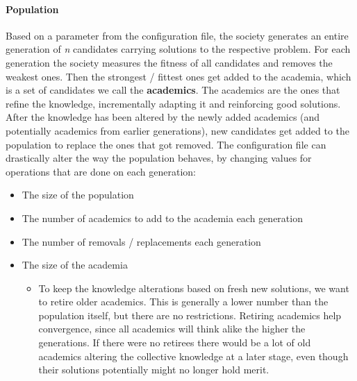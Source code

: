 \documentclass[a4paper,english]{report}
\begin{document}
		\paragraph{Population}
		Based on a parameter from the configuration file, the society generates an entire generation of \textit{n} candidates carrying solutions to the respective problem. For each generation the society measures the fitness of all candidates and removes the weakest ones. Then the strongest / fittest ones get added to the academia, which is a set of candidates we call the \textbf{academics}. The academics are the ones that refine the knowledge, incrementally adapting it and reinforcing good solutions. After the knowledge has been altered by the newly added academics (and potentially academics from earlier generations), new candidates get added to the population to replace the ones that got removed. The configuration file can drastically alter the way the population behaves, by changing values for operations that are done on each generation:
		\begin{itemize}
			\item The size of the population
			\item The number of academics to add to the academia each generation
			\item The number of removals / replacements each generation
			\item The size of the academia
			   \begin{itemize}
				\item To keep the knowledge alterations based on fresh new solutions, we want to retire older academics. This is generally a lower number than the population itself, but there are no restrictions. Retiring academics help convergence, since all academics will think alike the higher the generations. If there were no retirees there would be a lot of old academics altering the collective knowledge at a later stage, even though their solutions potentially might no longer hold merit.
				\end{itemize}
		\end{itemize}
		\clearpage
\end{document}
